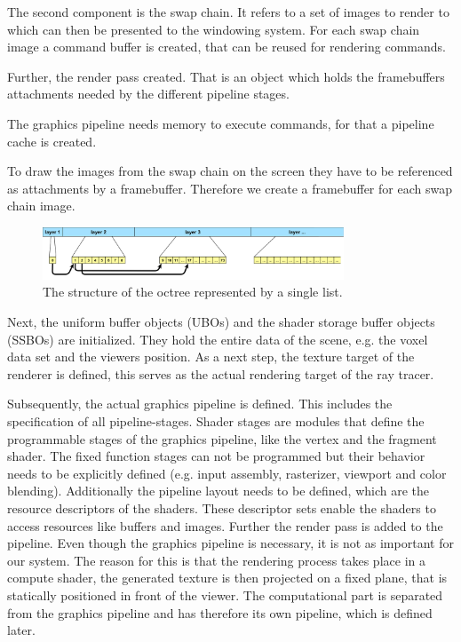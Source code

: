 \documentclass[12pt,conference]{IEEEtran}
\begin{document}
The second component is the swap chain. It refers to a set of images to render to which can then be presented to the windowing system. For each swap chain image a command buffer is created, that can be reused for rendering commands.

Further, the render pass created. That is an object which holds the framebuffers attachments needed by the different pipeline stages.

The graphics pipeline needs memory to execute commands, for that a pipeline cache is created.

To draw the images from the swap chain on the screen they have to be referenced as attachments by a framebuffer. Therefore we create a framebuffer for each swap chain image.
\begin{figure}[htp]
	\centering
	\includegraphics[width=0.8\textwidth]{images/datastructure.png}
	\caption{The structure of the octree represented by a single list.}
	\label{fig:datastructure}
\end{figure}
Next, the uniform buffer objects (UBOs) and the shader storage buffer objects (SSBOs) are initialized. They hold the entire data of the scene, e.g. the voxel data set and the viewers position. As a next step, the texture target of the renderer is defined, this serves as the actual rendering target of the ray tracer.
\par
Subsequently, the actual graphics pipeline is defined. This includes the specification of all pipeline-stages. Shader stages are modules that define the programmable stages of the graphics pipeline, like the vertex and the fragment shader. The fixed function stages can not be programmed but their behavior needs to be explicitly defined (e.g. input assembly, rasterizer, viewport and color blending). Additionally the pipeline layout needs to be defined, which are the resource descriptors of the shaders. These descriptor sets enable the shaders to access resources like buffers and images. Further the render pass is added to the pipeline. 
Even though the graphics pipeline is necessary, it is not as important for our system. The reason for this is that the rendering process takes place in a compute shader, the generated texture is then projected on a fixed plane, that is statically positioned in front of the viewer. The computational part is separated from the graphics pipeline and has therefore its own pipeline, which is defined later.
\end{document}
